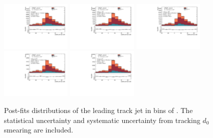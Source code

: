 \begin{figure}[htbp]
  \centering
 \includegraphics[width=0.3\textwidth]{figures/gbb/Sub_Sd0_Fits/Canv_Fit_0-Deltatheta-0628_coarse_x.pdf}
 \includegraphics[width=0.3\textwidth]{figures/gbb/Sub_Sd0_Fits/Canv_Fit_0628-Deltatheta-1256_coarse_x.pdf}
 \includegraphics[width=0.3\textwidth]{figures/gbb/Sub_Sd0_Fits/Canv_Fit_1256-Deltatheta-1884_coarse_x.pdf}\\
 \includegraphics[width=0.3\textwidth]{figures/gbb/Sub_Sd0_Fits/Canv_Fit_1884-Deltatheta-2512_coarse_x.pdf}
 \includegraphics[width=0.3\textwidth]{figures/gbb/Sub_Sd0_Fits/Canv_Fit_2512-Deltatheta-3140_coarse_x.pdf}


\caption{Post-fits \subsdzero distributions of the leading track jet in bins of \dphi. The statistical uncertainty and systematic uncertainty from tracking $d_0$ smearing are included.}
  \label{fig:dphi-postfits-leading-sub}
\end{figure}


